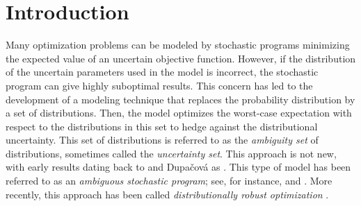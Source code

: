 \documentclass[opre,nonblindrev]{informs3} %
\begin{document}
%

\section{Introduction}

Many optimization problems can be modeled by stochastic programs minimizing the expected value of an uncertain objective function.
However, if the distribution of the uncertain parameters used in the model is incorrect, the stochastic program can give highly suboptimal results.
This concern has led to the development of a modeling technique that replaces the probability distribution by a set of distributions. 
Then, the model optimizes the worst-case expectation with respect to the distributions in this set to hedge against the distributional uncertainty.
This set of distributions is referred to as the {\it ambiguity set} of distributions, sometimes called the {\it uncertainty set}.   
This approach is not new, with early results dating back to \cite{scarf1958min} and Dupa{\v{c}}ov{\'{a}} as \cite{zackova1966minimax}. 
This type of model has been referred to as an {\it ambiguous stochastic program}; see, for instance, \cite{pflug2007ambiguity} and \cite{erdogan2006ambiguous}. 
More recently, this approach has been called {\it distributionally robust optimization} \citep{delage2010distributionally,goh_sim_10,mehrotra_papp_14,hanasusanto_etal_15}.  
\end{document}
